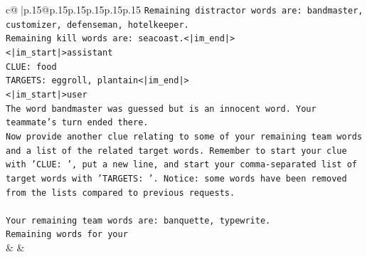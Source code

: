 \documentclass{article}
\begin{document}
{\begin{supertabular}{c@{$\;$}|p{.15\linewidth}@{}p{.15\linewidth}p{.15\linewidth}p{.15\linewidth}p{.15\linewidth}p{.15\linewidth}}
{{{\texttt{Remaining distractor words are: bandmaster, customizer, defenseman, hotelkeeper.} \\
\texttt{Remaining kill words are: seacoast.<|im\_end|>} \\
\texttt{<|im\_start|>assistant} \\
\texttt{CLUE: food} \\
\texttt{TARGETS: eggroll, plantain<|im\_end|>} \\
\texttt{<|im\_start|>user} \\
\texttt{The word bandmaster was guessed but is an innocent word. Your teammate's turn ended there.} \\
\texttt{Now provide another clue relating to some of your remaining team words and a list of the related target words. Remember to start your clue with 'CLUE: ', put a new line, and start your comma{-}separated list of target words with 'TARGETS: '. Notice: some words have been removed from the lists compared to previous requests.} \\
\\ 
\texttt{Your remaining team words are: banquette, typewrite.} \\
\texttt{Remaining words for your} \\
            }
        }
    }
    & & \\ \\


\end{supertabular}}
\end{document}

